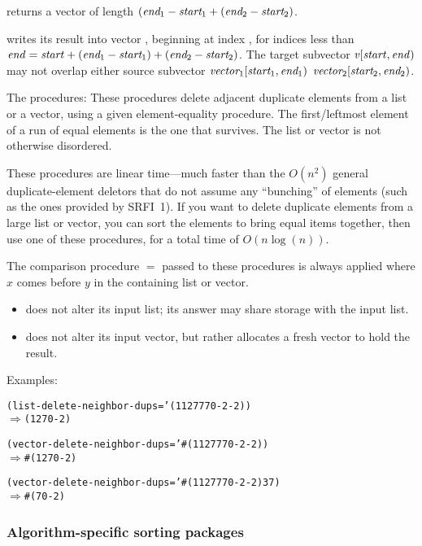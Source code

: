  returns a vector of length $(\var{end$_1$}-\var{start$_1$}+(\var{end$_2$}-\var{start$_2$})$.
    
 writes its result into vector ,
beginning at index , for indices less than \(\var{end} =
\var{start} + (\var{end$_1$}-\var{start$_1$}) +
(\var{end$_2$}-\var{start$_2$})\). The target subvector
  $\var{v}[\var{start},\var{end})$ may not overlap either source
subvector $\var{vector$_1$}[\var{start$_1$},\var{end$_1$})$ $\var{vector$_2$}[\var{start$_2$},\var{end$_2$})$.

The  procedures:
These procedures delete adjacent duplicate elements from a list or a
vector, using a given element-equality procedure. The first/leftmost
element of a run of equal elements is the one that survives. The list or
vector is not otherwise disordered.
    
These procedures are linear time---much faster than the $O(n^2)$ general
duplicate-element deletors that do not assume any ``bunching'' of elements
(such as the ones provided by SRFI~1). If you want to delete duplicate
elements from a large list or vector, you can sort the elements to bring
equal items together, then use one of these procedures, for a total time
of $O(n\log(n))$.
    
The comparison procedure \(=\) passed to these procedures is always
applied
%
%
where $x$ comes before $y$ in the containing list or vector.

\begin{itemize}
\item {} does not alter its input list; its answer
  may share storage with the input list.
\item {} does not alter its input vector, but
  rather allocates a fresh vector to hold the result.
\end{itemize}
%
Examples:
%
\begin{alltt}
(list-delete-neighbor-dups = '(1 1 2 7 7 7 0 -2 -2))
  \(\Longrightarrow\) (1 2 7 0 -2)

(vector-delete-neighbor-dups = '#(1 1 2 7 7 7 0 -2 -2))
  \(\Longrightarrow\) #(1 2 7 0 -2)

(vector-delete-neighbor-dups = '#(1 1 2 7 7 7 0 -2 -2) 3 7)
  \(\Longrightarrow\) #(7 0 -2)

\end{alltt}
         
\subsubsection{Algorithm-specific sorting packages}

